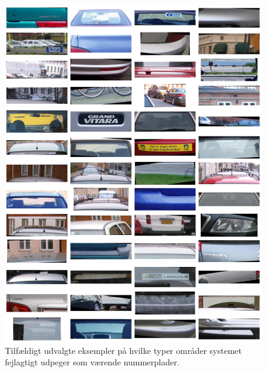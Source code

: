 \documentclass[11pt,a4paper,final]{article}
\begin{document}
\begin{figure}[htp]
\centering
\includegraphics[width=12cm]{appendix/illu/plates_error.jpg} 
\caption{Tilfældigt udvalgte eksempler på hvilke typer områder systemet fejlagtigt udpeger som værende nummerplader.}
\label{fig:illu:wrong_candidates}
\end{figure}




\end{document}
